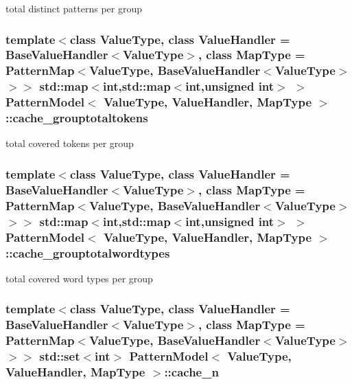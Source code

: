 total distinct patterns per group 

\hypertarget{classPatternModel_aebbf8c45dfa1993d1a9dd262b2b30783}{}
\subsubsection[{cache\+\_\+grouptotaltokens}]{\setlength{\rightskip}{0pt plus 5cm}template$<$class Value\+Type, class Value\+Handler = Base\+Value\+Handler$<$\+Value\+Type$>$, class Map\+Type = Pattern\+Map$<$\+Value\+Type, Base\+Value\+Handler$<$\+Value\+Type$>$$>$$>$ std\+::map$<$int,std\+::map$<$int,unsigned int$>$ $>$ {\bf Pattern\+Model}$<$ Value\+Type, Value\+Handler, Map\+Type $>$\+::cache\+\_\+grouptotaltokens\hspace{0.3cm}{\ttfamily [protected]}}\label{classPatternModel_aebbf8c45dfa1993d1a9dd262b2b30783}


total covered tokens per group 

\hypertarget{classPatternModel_a4dee966a62bacaab4d107bb4ec5050c0}{}
\subsubsection[{cache\+\_\+grouptotalwordtypes}]{\setlength{\rightskip}{0pt plus 5cm}template$<$class Value\+Type, class Value\+Handler = Base\+Value\+Handler$<$\+Value\+Type$>$, class Map\+Type = Pattern\+Map$<$\+Value\+Type, Base\+Value\+Handler$<$\+Value\+Type$>$$>$$>$ std\+::map$<$int,std\+::map$<$int,unsigned int$>$ $>$ {\bf Pattern\+Model}$<$ Value\+Type, Value\+Handler, Map\+Type $>$\+::cache\+\_\+grouptotalwordtypes\hspace{0.3cm}{\ttfamily [protected]}}\label{classPatternModel_a4dee966a62bacaab4d107bb4ec5050c0}


total covered word types per group 

\hypertarget{classPatternModel_a18c0c93e988cce16fdeb5a8a65e878b1}{}
\subsubsection[{cache\+\_\+n}]{\setlength{\rightskip}{0pt plus 5cm}template$<$class Value\+Type, class Value\+Handler = Base\+Value\+Handler$<$\+Value\+Type$>$, class Map\+Type = Pattern\+Map$<$\+Value\+Type, Base\+Value\+Handler$<$\+Value\+Type$>$$>$$>$ std\+::set$<$int$>$ {\bf Pattern\+Model}$<$ Value\+Type, Value\+Handler, Map\+Type $>$\+::cache\+\_\+n\hspace{0.3cm}{\ttfamily [protected]}}\label{classPatternModel_a18c0c93e988cce16fdeb5a8a65e878b1}
\hypertarget{classPatternModel_a2f1b4eec80a00ef9c6effea477cc98f4}{}

